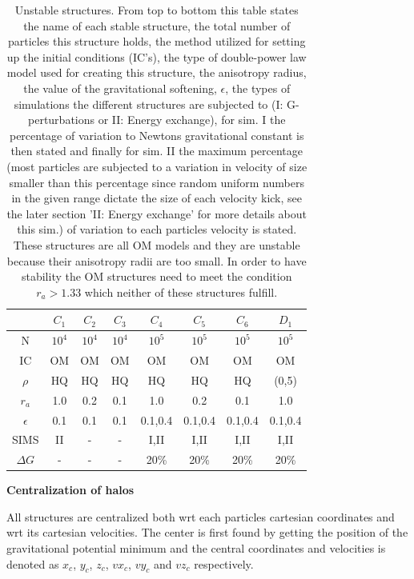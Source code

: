 \begin{table}[!htbp]
\centering
\begin{tabular}{|c|c|c|c|c|c|c|c|}
\hline
   &  $C_1$ & $C_2$  & $C_3$  & $C_4$  & $C_5$  & $C_6$  & $D_1$    \\ \hline
 N & $10^4$ & $10^4$ & $10^4$ & $10^5$ & $10^5$ & $10^5$ & $10^5$   \\ \hline
 IC         &   OM   &   OM   &   OM   &   OM   &   OM   &   OM     &   OM    \\ \hline
 $\rho$		&   HQ   &  HQ    &   HQ   &   HQ   &   HQ   &  HQ      &  (0,5)  \\ \hline
 $r_a$		&  1.0   &  0.2   &  0.1   &  1.0   &  0.2   &  0.1     &   1.0   \\ \hline
 $\epsilon$	&  0.1   &  0.1   &  0.1   &0.1,0.4 & 0.1,0.4& 0.1,0.4  & 0.1,0.4 \\ \hline
 SIMS		&   II   &   -    &   -    &  I,II  &  I,II  &  I,II    &  I,II   \\ \hline
 $\Delta G$ &    -   &   -    &   -    &  20\%  &  20\%  &  20\%    &  20\%    \\ \hline
\end{tabular}
\caption {Unstable structures. From top to bottom this table states the name of each stable structure, the total number of particles this structure holds, the method utilized for setting up the initial conditions (IC's), the type of double-power law model used for creating this structure, the anisotropy radius, the value of the gravitational softening, $\epsilon$, the types of simulations the different structures are subjected to (I: G-perturbations or II: Energy exchange), for sim. I the percentage of variation to Newtons gravitational constant is then stated and finally for sim. II the maximum percentage (most particles are subjected to a variation in velocity of size smaller than this percentage since random uniform numbers in the given range dictate the size of each velocity kick, see the later section 'II: Energy exchange' for more details about this sim.) of variation to each particles velocity is stated. These structures are all OM models and they are unstable because their anisotropy radii are too small. In order to have stability the OM structures need to meet the condition $r_a > 1.33$ which neither of these structures fulfill.}
\end{table}

\centerline{\textbf{Centralization of halos}} 
All structures are centralized both wrt each particles cartesian coordinates and wrt its cartesian velocities. The center is first found by getting the position of the gravitational potential minimum and the central coordinates and velocities is denoted as $x_c$, $y_c$, $z_c$, $vx_c$, $vy_c$ and $vz_c$ respectively. 

